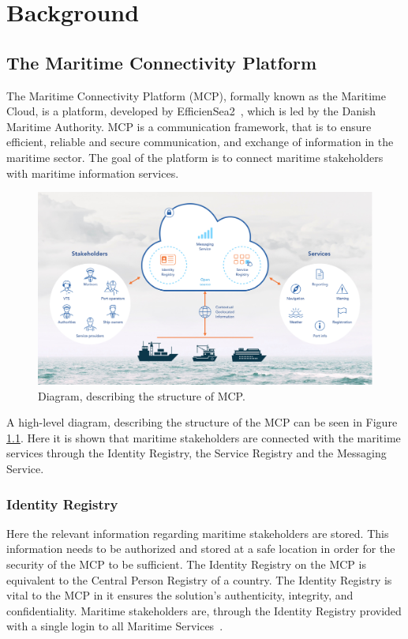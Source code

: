 \chapter{Background}

\section{The Maritime Connectivity Platform}
The Maritime Connectivity Platform (MCP), formally known as the Maritime Cloud, is a platform, developed by EfficienSea2~\cite{efficienSea2}, which is led by the Danish Maritime Authority. MCP is a communication framework, that is to ensure efficient, reliable and secure communication, and exchange of information in the maritime sector.
The goal of the platform is to connect maritime stakeholders with maritime information services.
\begin{figure}
	\includegraphics[width=1\textwidth]{figures/MCPStructure}
	\caption{Diagram, describing the structure of MCP\cite{efficienSea2}.}
	\label{fig:MCPStruct}
\end{figure}\noindent
A high-level diagram, describing the structure of the MCP can be seen in Figure \ref{fig:MCPStruct}. Here it is shown that maritime stakeholders are connected with the maritime services through the Identity Registry, the Service Registry and the Messaging Service.

\subsection{Identity Registry}
Here the relevant information regarding maritime stakeholders are stored. This information needs to be authorized and stored at a safe location in order for the security of the MCP to be sufficient. The Identity Registry on the MCP is equivalent to the Central Person Registry of a country. The Identity Registry is vital to the MCP in it ensures the solution's authenticity, integrity, and confidentiality. Maritime stakeholders are, through the Identity Registry provided with a single login to all Maritime Services~\cite{efficienSea2}.
